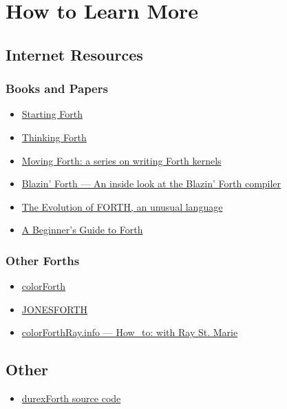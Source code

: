 \section{How to Learn More}

\subsection{Internet Resources}

\subsubsection{Books and Papers}

\begin{itemize}
\item \href{http://www.forth.com/starting-forth/}{Starting Forth}
\item \href{http://thinking-forth.sourceforge.net/}{Thinking Forth}
\item \href{http://www.bradrodriguez.com/papers/}{Moving Forth: a series on writing Forth kernels}
\item \href{http://www.csbruce.com/~csbruce/cbm/transactor/v7/i5/p058.html}{Blazin' Forth --- An inside look at the Blazin' Forth compiler}
\item \href{http://www.drdobbs.com/architecture-and-design/the-evolution-of-forth-an-unusual-langua/228700557}{The Evolution of FORTH, an unusual language}
\item \href{http://galileo.phys.virginia.edu/classes/551.jvn.fall01/primer.htm}{A Beginner's Guide to Forth}
\end{itemize}

\subsubsection{Other Forths}

\begin{itemize}
\item \href{http://www.colorforth.com/cf.html}{colorForth}
\item \href{http://www.annexia.org/forth}{JONESFORTH}
\item \href{http://colorforthray.info/}{colorForthRay.info --- How\_to: with Ray St. Marie}
\end{itemize}

\subsection{Other}

\begin{itemize}
\item \href{https://github.com/jkotlinski/durexforth}{durexForth source code}
\end{itemize}
